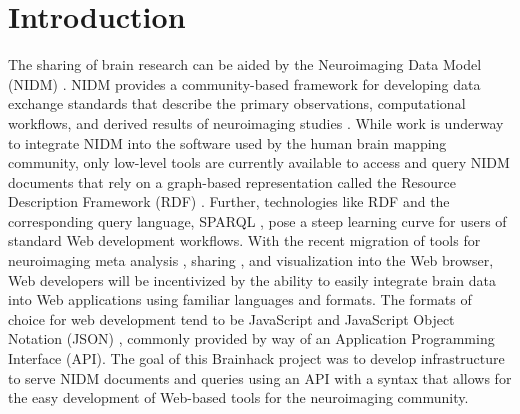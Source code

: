 \documentclass[twocolumn]{bmcart}%
\begin{document}
\section{Introduction}\label{introduction}
The sharing of brain research can be aided by the Neuroimaging Data Model (NIDM) \cite{Keator2013-rc,noauthor_undated-jz,noauthor_undated-pr}. NIDM provides a community-based framework for developing data exchange standards that describe the primary observations, computational workflows, and derived results of neuroimaging studies \cite{noauthor_undated-jv}. While work is underway to integrate NIDM into the software used by the human brain mapping community, only low-level tools are currently available to access and query NIDM documents that rely on a graph-based representation called the Resource Description Framework (RDF) \cite{noauthor_undated-hj}. Further, technologies like RDF and the corresponding query language, SPARQL \cite{noauthor_undated-cp}, pose a steep learning curve for users of standard Web development workflows. With the recent migration of tools for neuroimaging meta analysis \cite{Yarkoni2011-rg,Reid2015-gt}, sharing \cite{Crawford2016-zl,Landis2016-wo,Book2016-ro,Herrick2016-bw,Hodge2016-ht,Jernigan2016-dz,Kini2016-sg,Wang2016-nd,Gorgolewski2015-sf}, and visualization \cite{Gutman2014-hz,Gao2015-pz,noauthor_undated-ca} into the Web browser, Web developers will be incentivized by the ability to easily integrate brain data into Web applications using familiar languages and formats. The formats of choice for web development tend to be JavaScript and JavaScript Object Notation (JSON) \cite{Wikipedia_contributors2015-on,noauthor_undated-tz}, commonly provided by way of an Application Programming Interface (API). The goal of this Brainhack project was to develop infrastructure to serve NIDM documents and queries using an API with a syntax that allows for the easy development of Web-based tools for the neuroimaging community.
\end{document}
